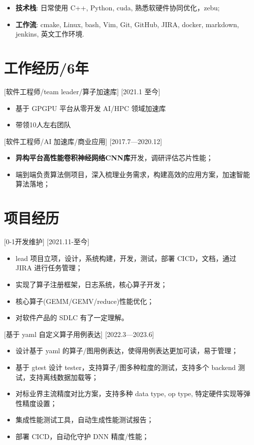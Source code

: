\documentclass{resume}
\begin{document}
\begin{itemize}
  \item \textbf{技术栈}: 日常使用 C++, Python, cuda, 熟悉软硬件协同优化，zebu;
  \item \textbf{工作流}: cmake, Linux, bash, Vim, Git, GitHub, JIRA, docker, markdown, jenkins, 英文工作环境.
\end{itemize}

\section{工作经历/6年}

[软件工程师/team leader/算子加速库]
[2021.1 至今]

\begin{itemize}
  \item 基于 GPGPU 平台从零开发 AI/HPC 领域加速库
  \item 带领10人左右团队
\end{itemize}

[软件工程师/AI 加速库/商业应用]
[2017.7—2020.12] 

\begin{itemize}
  \item \textbf{异构平台高性能卷积神经网络CNN库}开发，调研评估芯片性能；
  \item 端到端负责算法侧项目，深入梳理业务需求，构建高效的应用方案，加速智能算法落地；
\end{itemize}

\section{项目经历}

[0-1开发维护]
[2021.11-至今]
\begin{itemize}
  \item lead 项目立项，设计，系统构建，开发，测试，部署 CICD，文档，通过 JIRA 进行任务管理；
  \item 实现了算子注册框架，日志系统，核心算子开发；
  \item 核心算子(GEMM/GEMV/reduce)性能优化；
  \item 对软件产品的 SDLC 有了一定理解。
\end{itemize}


[基于 yaml 自定义算子用例表达]
[2022.3—2023.6]

\begin{itemize}
  \item 设计基于 yaml 的算子/图用例表达，使得用例表达更加可读，易于管理；
  \item 基于 gtest 设计 tester，支持算子/图多种粒度的测试，支持多个 backend 测试，支持离线数据加载等；
  \item 对标业界主流精度对比方案，支持多种 data type, op type, 特定硬件实现等弹性精度设置；
  \item 集成性能测试工具，自动生成性能测试报告；
  \item 部署 CICD，自动化守护 DNN 精度/性能；
\end{itemize}
\end{document}
